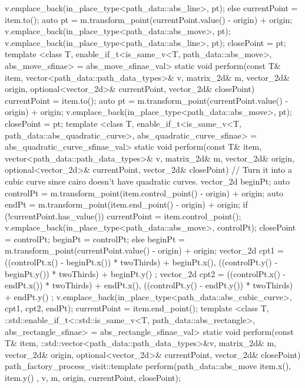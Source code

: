 \begin{codeblock}
{{{{          v.emplace_back(in_place_type<path_data::abs_line>, pt);
        }
        else {
          currentPoint = item.to();
          auto pt = m.transform_point(currentPoint.value() - origin) + origin;
          v.emplace_back(in_place_type<path_data::abs_move>, pt);
          v.emplace_back(in_place_type<path_data::abs_line>, pt);
          closePoint = pt;
        }
      }
      template <class T, enable_if_t<is_same_v<T, path_data::abs_move>, abs_move_sfinae> = abs_move_sfinae_val>
      static void perform(const T& item, vector<path_data::path_data_types>& v, matrix_2d& m, vector_2d& origin, optional<vector_2d>& currentPoint, vector_2d& closePoint) {
        currentPoint = item.to();
        auto pt = m.transform_point(currentPoint.value() - origin) + origin;
        v.emplace_back(in_place_type<path_data::abs_move>, pt);
        closePoint = pt;
      }
      template <class T, enable_if_t<is_same_v<T, path_data::abs_quadratic_curve>, abs_quadratic_curve_sfinae> = abs_quadratic_curve_sfinae_val>
      static void perform(const T& item, vector<path_data::path_data_types>& v, matrix_2d& m, vector_2d& origin, optional<vector_2d>& currentPoint, vector_2d& closePoint) {
        // Turn it into a cubic curve since cairo doesn't have quadratic curves.
        vector_2d beginPt;
        auto controlPt = m.transform_point(item.control_point() - origin) + origin;
        auto endPt = m.transform_point(item.end_point() - origin) + origin;
        if (!currentPoint.has_value()) {
          currentPoint = item.control_point();
          v.emplace_back(in_place_type<path_data::abs_move>, controlPt);
          closePoint = controlPt;
          beginPt = controlPt;
        }
        else {
          beginPt = m.transform_point(currentPoint.value() - origin) + origin;
        }
        vector_2d cpt1 = { ((controlPt.x() - beginPt.x()) * twoThirds) + beginPt.x(), ((controlPt.y() - beginPt.y()) * twoThirds) + beginPt.y() };
        vector_2d cpt2 = { ((controlPt.x() - endPt.x()) * twoThirds) + endPt.x(), ((controlPt.y() - endPt.y()) * twoThirds) + endPt.y() };
        v.emplace_back(in_place_type<path_data::abs_cubic_curve>, cpt1, cpt2, endPt);
        currentPoint = item.end_point();
      }
      template <class T, ::std::enable_if_t<::std::is_same_v<T, path_data::abs_rectangle>, abs_rectangle_sfinae> = abs_rectangle_sfinae_val>
      static void perform(const T& item, ::std::vector<path_data::path_data_types>&v, matrix_2d& m, vector_2d& origin, optional<vector_2d>& currentPoint, vector_2d& closePoint) {
        path_factory_process_visit::template perform(path_data::abs_move{ { item.x(), item.y() } }, v, m, origin, currentPoint, closePoint);
}}}
\end{codeblock}
